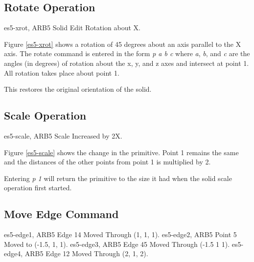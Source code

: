 \subsection{Rotate Operation}
\mfig es5-xrot, ARB5 Solid Edit Rotation about X.


Figure \ref{es5-xrot} shows a rotation of 45 degrees
about an axis parallel to the X axis.  
The rotate command is entered in the form {\em p a b c}
where {\em a}, {\em b}, and {\em c} are the angles
(in degrees) of rotation about the x, y, and z axes and intersect at point 1.
All rotation takes place about point 1. 


This restores the original orientation of the solid.

\subsection{Scale Operation}
\mfig es5-scale, ARB5 Scale Increased by 2X.


Figure \ref{es5-scale} shows the change in the primitive.
Point 1 remains the same
and the distances of the other points from point 1 is multiplied by 2.

Entering {\em p 1} will return the primitive
to the size it had when the solid scale operation first started.


\subsection{Move Edge Command}
\mfig es5-edge1, ARB5 Edge 14 Moved Through (1, 1, 1).
\mfig es5-edge2, ARB5 Point 5 Moved to (-1.5, 1, 1).
\mfig es5-edge3, ARB5 Edge 45 Moved Through (-1.5 1 1).
\mfig es5-edge4, ARB5 Edge 12 Moved Through (2, 1, 2).


